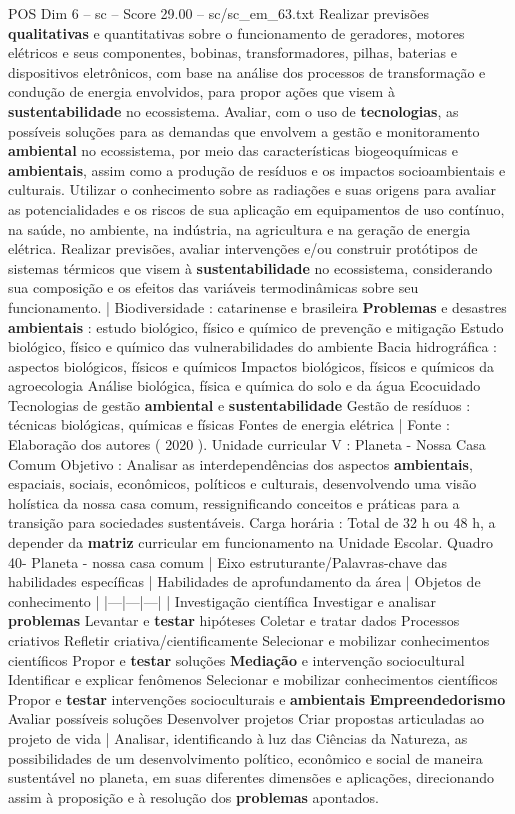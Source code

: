 \begin{textsample}{POS Dim 6 – sc – Score 29.00 – sc/sc\_em\_63.txt}
Realizar previsões \textbf{qualitativas} e quantitativas sobre o funcionamento de geradores, motores elétricos e seus componentes, bobinas, transformadores, pilhas, baterias e dispositivos eletrônicos, com base na análise dos processos de transformação e condução de energia envolvidos, para propor ações que visem à \textbf{sustentabilidade} no ecossistema.
Avaliar, com o uso de \textbf{tecnologias}, as possíveis soluções para as demandas que envolvem a gestão e monitoramento \textbf{ambiental} no ecossistema, por meio das características biogeoquímicas e \textbf{ambientais}, assim como a produção de resíduos e os impactos socioambientais e culturais.
Utilizar o conhecimento sobre as radiações e suas origens para avaliar as potencialidades e os riscos de sua aplicação em equipamentos de uso contínuo, na saúde, no ambiente, na indústria, na agricultura e na geração de energia elétrica.
Realizar previsões, avaliar intervenções e/ou construir protótipos de sistemas térmicos que visem à \textbf{sustentabilidade} no ecossistema, considerando sua composição e os efeitos das variáveis termodinâmicas sobre seu funcionamento. | Biodiversidade : catarinense e brasileira \textbf{Problemas} e desastres \textbf{ambientais} : estudo biológico, físico e químico de prevenção e mitigação Estudo biológico, físico e químico das vulnerabilidades do ambiente Bacia hidrográfica : aspectos biológicos, físicos e químicos Impactos biológicos, físicos e químicos da agroecologia Análise biológica, física e química do solo e da água Ecocuidado Tecnologias de gestão \textbf{ambiental} e \textbf{sustentabilidade} Gestão de resíduos : técnicas biológicas, químicas e físicas Fontes de energia elétrica | Fonte : Elaboração dos autores ( 2020 ).
Unidade curricular V : Planeta - Nossa Casa Comum Objetivo : Analisar as interdependências dos aspectos \textbf{ambientais}, espaciais, sociais, econômicos, políticos e culturais, desenvolvendo uma visão holística da nossa casa comum, ressignificando conceitos e práticas para a transição para sociedades sustentáveis.
Carga horária : Total de 32 h ou 48 h, a depender da \textbf{matriz} curricular em funcionamento na Unidade Escolar.
Quadro 40- Planeta - nossa casa comum | Eixo estruturante/Palavras-chave das habilidades específicas | Habilidades de aprofundamento da área | Objetos de conhecimento | |---|---|---| | Investigação científica Investigar e analisar \textbf{problemas} Levantar e \textbf{testar} hipóteses Coletar e tratar dados Processos criativos Refletir criativa/cientificamente Selecionar e mobilizar conhecimentos científicos Propor e \textbf{testar} soluções \textbf{Mediação} e intervenção sociocultural Identificar e explicar fenômenos Selecionar e mobilizar conhecimentos científicos Propor e \textbf{testar} intervenções socioculturais e \textbf{ambientais} \textbf{Empreendedorismo} Avaliar possíveis soluções Desenvolver projetos Criar propostas articuladas ao projeto de vida | Analisar, identificando à luz das Ciências da Natureza, as possibilidades de um desenvolvimento político, econômico e social de maneira sustentável no planeta, em suas diferentes dimensões e aplicações, direcionando assim à proposição e à resolução dos \textbf{problemas} apontados.

\end{textsample}
